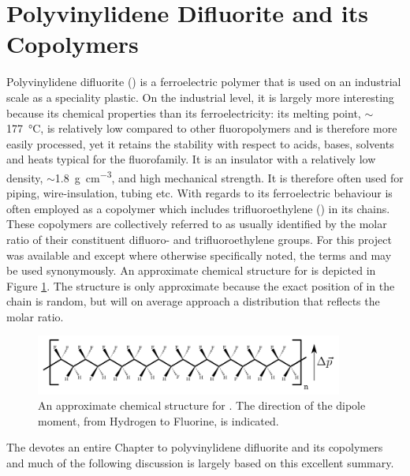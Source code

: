 \section{Polyvinylidene Difluorite and its Copolymers}
Polyvinylidene difluorite (\pvdf{}) is a ferroelectric polymer that is used on an industrial scale as a speciality plastic. On the industrial level, it is largely more interesting because its chemical properties than its ferroelectricity: its melting point, $\sim$\SI{177}{\degreeCelsius}, is relatively low compared to other fluoropolymers and is therefore more easily processed, yet it retains the stability with respect to acids, bases, solvents and heats typical for the fluorofamily. It is an insulator with a relatively low density, $\sim$\SI{1.8}{\gram\per\cubic\centi\metre}, and high mechanical strength. It is therefore often used for piping, wire-insulation, tubing etc. With regards to its ferroelectric behaviour \pvdf{} is often employed as a copolymer which includes trifluoroethylene (\trfe{}) in its chains. These copolymers are collectively referred to as \pvfe{} usually identified by the molar ratio of their constituent difluoro- and trifluoroethylene groups. For this project \pvtr{} was available and except where otherwise specifically noted, the terms \pvdf{} and \pvtr{} may be used synonymously. An approximate chemical structure for \pvtr{} is depicted in Figure \ref{fig:pvstruct}. The structure is only approximate because the exact position of \trfe{} in the chain is random, but will on average approach a distribution that reflects the molar ratio.\\
\begin{figure}[b]
\centering
	\includegraphics[width=0.9\textwidth]{./figs/chap1/pvdfstruct}
	\caption{An approximate chemical structure for \pvtr{}. The direction of the dipole moment, from Hydrogen to Fluorine, is indicated.}
	\label{fig:pvstruct}
\end{figure}
The \emph{} devotes an entire Chapter to polyvinylidene difluorite and its copolymers~\cite[pp. 807-820]{encyclopedia} and much of the following discussion is largely based on this excellent summary.\\
